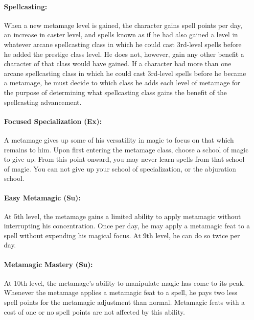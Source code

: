 \paragraph{Spellcasting:} When a new metamage level is gained, 
the character gains spell points per day, an increase in caster level, and spells known
as if he had also gained a level in whatever arcane spellcasting class in which he could cast 3rd-level spells before he added the prestige class level. 
He does not, however, gain any other benefit a character of that class would have gained. 
If a character had more than one arcane spellcasting class in which he could cast 3rd-level spells before he became a metamage, 
he must decide to which class he adds each level of metamage for the purpose of determining what spellcasting class gains the benefit of the spellcasting advancement.

\paragraph{Focused Specialization (Ex):}
A metamage gives up some of his versatility in magic to focus on that which remains to him.
Upon first entering the metamage class, choose a school of magic to give up.
From this point onward, you may never learn spells from that school of magic.
You can not give up your school of specialization, or the abjuration school.

\paragraph{Easy Metamagic (Su):}
At 5th level, the metamage gains a limited ability to apply metamagic without interrupting his concentration.
Once per day, he may apply a metamagic feat to a spell without expending his magical focus.
At 9th level, he can do so twice per day.

\paragraph{Metamagic Mastery (Su):}
At 10th level, the metamage's ability to manipulate magic has come to its peak.
Whenever the metamage applies a metamagic feat to a spell, he pays two less spell points for the metamagic adjustment than normal.
Metamagic feats with a cost of one or no spell points are not affected by this ability.